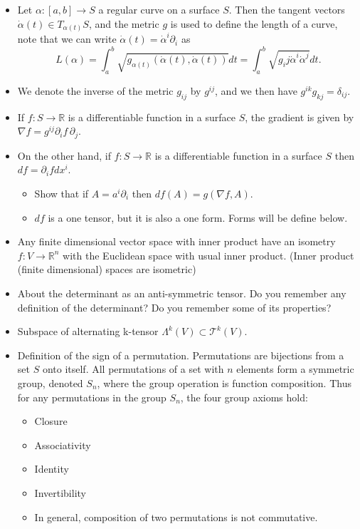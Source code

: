 \documentclass{amsart}
\begin{document}
\begin{itemize}
\item Let \(\alpha: [a,b] \to S\) a regular curve on a surface \(S\). Then the tangent vectors \(\dot{\alpha}(t) \in T_{\alpha(t)}S\), and the metric \(g\) is used to define the length of a curve, note that we can write \(\dot{\alpha}(t) = \dot{\alpha}^i\partial_i\) as \[ L(\alpha) = \int_{a}^{b} \sqrt{g_{\alpha(t)}(\dot{\alpha}(t),\dot{\alpha}(t))} dt = \int_{a}^{b} \sqrt{g_ij\dot{\alpha}^i\dot{\alpha}^j} dt. \]
\item We denote the inverse of the metric \(g_{ij}\) by \(g^{ij}\), and we then have \(g^{ik}g_{kj} = \delta_{ij}\).
\item If \(f:S\to \mathbb{R}\) is a differentiable function in a surface \(S\), the gradient is given by \(\nabla f = g^{ij}\partial_if \, \partial_j\).
\item On the other hand, if \(f:S\to \mathbb{R}\) is a differentiable function in a surface \(S\) then \(df = \partial_i f dx^{i}\).
\begin{itemize}
\item Show that if \(A = a^i\partial_i\) then \(df(A) = g( \nabla f, A)\).
\item \(df\) is a one tensor, but it is also a one form. Forms will be define below.
\end{itemize}
\item Any finite dimensional vector space with inner product have an isometry \(f:V\to \mathbb{R}^n\) with the Euclidean space with usual inner product. (Inner product (finite dimensional) spaces are isometric)
\item About the determinant as an anti-symmetric tensor. Do you remember any definition of the determinant? Do you remember some of its properties?
\item Subspace of alternating k-tensor \(\Lambda^k(V) \subset \mathcal{T}^k(V)\).
\item Definition of the sign of a permutation. Permutations are bijections from a set \(S\) onto itself. All permutations of a set with \(n\) elements form a symmetric group, denoted \(S_n\), where the group operation is function composition. Thus for any permutations in the group \(S_{n}\), the four group axioms hold:
\begin{itemize}
\item Closure
\item Associativity
\item Identity
\item Invertibility
\item In general, composition of two permutations is not commutative.

\end{itemize}
\end{itemize}
\end{document}
